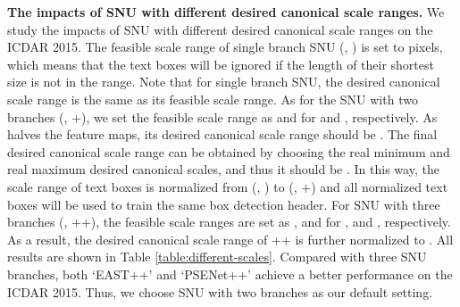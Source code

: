 \documentclass[10pt,twocolumn,letterpaper]{article}
\begin{document}
\textbf{The impacts of SNU with different desired canonical scale ranges.} We study the impacts of SNU with different desired canonical scale ranges on the ICDAR 2015.
The feasible scale range of single branch SNU (\ie, ) is set to  pixels, which means that the text boxes will be ignored if the length of their shortest size is not in the range. Note that for single branch SNU, the desired canonical scale range is the same as its feasible scale range. As for the SNU with two branches (\ie, +), we set the feasible scale range as  and  for  and , respectively. As  halves the feature maps, its desired canonical scale range should be . The final desired canonical scale range can be obtained by choosing the real minimum and real maximum desired canonical scales, and thus it should be . In this way, the scale range of text boxes is normalized from  (\ie, ) to  (\ie, +) and all normalized text boxes will be used to train the same box detection header.
For SNU with three branches (\ie, ++), the feasible scale ranges are set as  ,  and  for ,  and , respectively. As a result, the desired canonical scale range of ++ is further normalized to . All results are shown in Table \ref{table:different-scales}.
Compared with three SNU branches, both `EAST++' and `PSENet++' achieve a better performance on the ICDAR 2015. Thus, we choose SNU with two branches as our default setting.
\end{document}

